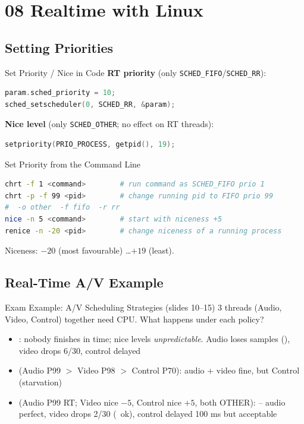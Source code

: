 \section{08 Realtime with Linux}

\subsection{Setting Priorities}

\begin{KR}{Set Priority / Nice in Code}
    \textbf{RT priority} (only \texttt{SCHED\_FIFO}/\texttt{SCHED\_RR}):
\begin{lstlisting}[language=C, style=basesmol, aboveskip=2pt, belowskip=2pt]
param.sched_priority = 10;
sched_setscheduler(0, SCHED_RR, &param);
\end{lstlisting}
    \textbf{Nice level} (only \texttt{SCHED\_OTHER}; no effect on RT threads):
\begin{lstlisting}[language=C, style=basesmol, aboveskip=2pt, belowskip=2pt]
setpriority(PRIO_PROCESS, getpid(), 19);
\end{lstlisting}
\end{KR}

\begin{KR}{Set Priority from the Command Line}
\begin{lstlisting}[language=bash, style=basesmol, aboveskip=2pt, belowskip=2pt]
chrt -f 1 <command>        # run command as SCHED_FIFO prio 1
chrt -p -f 99 <pid>        # change running pid to FIFO prio 99
#  -o other  -f fifo  -r rr
nice -n 5 <command>        # start with niceness +5
renice -n -20 <pid>        # change niceness of a running process
\end{lstlisting}
    Niceness: $-20$ (most favourable) \dots $+19$ (least).
\end{KR}

\subsection{Real-Time A/V Example}

\begin{example2}{Exam Example: A/V Scheduling Strategies (slides 10--15)}
    3 threads (Audio, Video, Control) together need  CPU. What
    happens under each policy?
    \tcblower
    \begin{itemize}
        \item {}: nobody finishes in time; nice
              levels \emph{unpredictable}. Audio loses samples (), video drops 6/30, control delayed
        \item {} (Audio P99 $>$ Video P98 $>$
              Control P70): audio + video fine, but Control 
              (starvation)
        \item {} (Audio P99 RT; Video nice $-5$, Control nice $+5$,
              both OTHER):  -- audio perfect, video
              drops 2/30 (~ok), control delayed 100 ms but acceptable
    \end{itemize}
\end{example2}

